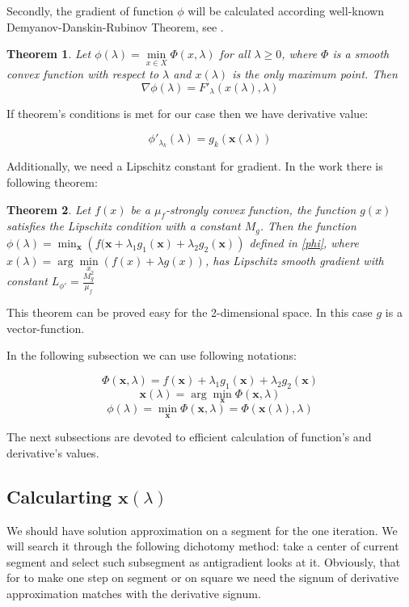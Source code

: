 \documentclass[12pt]{article}
\newtheorem{theorem}{Theorem}[section]
\begin{document}
Secondly, the gradient of function $\phi$ will be calculated according well-known Demyanov-Danskin-Rubinov Theorem, see \cite{DDR-theorem}.

\begin{theorem}
Let $\phi(\lambda)=\min\limits_{x\in X}\Phi(x,\lambda)$ for all $\lambda\geq0$, where $\Phi$ is a smooth convex function with respect to $\lambda$ and $x(\lambda)$ is the only maximum point. Then
$$\nabla \phi(\lambda) = F'_\lambda\left(x(\lambda),\lambda\right)$$
\end{theorem}

If theorem's conditions is met for our case then we have derivative value:

\begin{equation}
\phi'_{\lambda_k}(\lambda) = g_k\left(\textbf{x}(\lambda)\right)
\end{equation}

Additionally, we need a Lipschitz constant for gradient. In the work \cite{Stonykin} there is following theorem:
\begin{theorem}
Let $f(x)$ be a $\mu_f$-strongly convex function, the function $g(x)$ satisfies the Lipschitz condition with a constant $M_g$. Then the function $\phi(\lambda) = \min_\textbf{x}\left(f(\textbf{x}+\lambda_1g_1(\textbf{x}) + \lambda_2g_2(\textbf{x})\right)$ defined in \ref{phi}, where $x(\lambda) = \arg\min\limits_x(f(x)+\lambda g(x))$, has Lipschitz smooth gradient with constant $L_{\phi'} = \frac{M_g^2}{\mu_f}$
\end{theorem}

This theorem can be proved easy for the 2-dimensional space. In this case $g$ is a vector-function.

In the following subsection we can use following notations:

$$\Phi(\textbf{x},\lambda) = f(\textbf{x}) + \lambda_1g_1(\textbf{x}) + \lambda_2g_2(\textbf{x})$$
$$\textbf{x}(\lambda) = \arg\min_\textbf{x}\Phi(\textbf{x}, \lambda)$$
$$\phi(\lambda) = \min_\textbf{x} \Phi(\textbf{x}, \lambda) = \Phi(\textbf{x}(\lambda), \lambda)$$

The next subsections are devoted to efficient calculation of function's and derivative's values.

\subsection{Calcularting $\textbf{x}(\lambda)$}

We should have solution approximation on a segment for the one iteration. We will search it through the following dichotomy method: take a center of current segment and select such subsegment as antigradient looks at it. Obviously, that for to make one step on segment or on square we need the signum of derivative approximation matches with the derivative signum.
\end{document}
